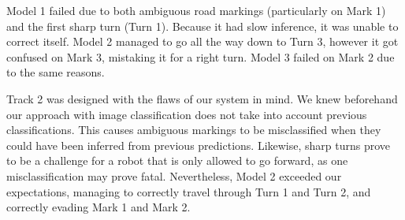 Model 1 failed due to both ambiguous road markings (particularly on Mark 1) and the first sharp
turn (Turn 1). Because it had slow inference, it was unable to correct itself. Model 2 managed to
go all the way down to Turn 3, however it got confused on Mark 3, mistaking it for a right turn.
Model 3 failed on Mark 2 due to the same reasons.

Track 2 was designed with the flaws of our system in mind. We knew beforehand our approach with
image classification does not take into account previous classifications. This causes ambiguous
markings to be misclassified when they could have been inferred from previous predictions.
Likewise, sharp turns prove to be a challenge for a robot that is only allowed to go forward, as
one misclassification may prove fatal. Nevertheless, Model 2 exceeded our expectations, managing to
correctly travel through Turn 1 and Turn 2, and correctly evading Mark 1 and Mark 2.
